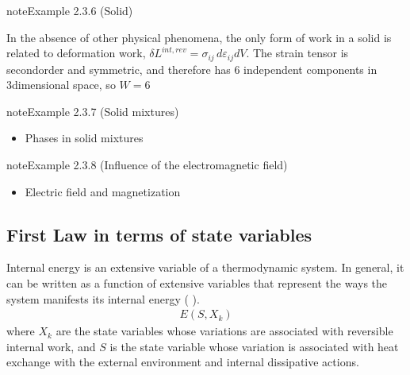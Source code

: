 \documentclass[letterpaper,10pt,english]{jupyterBook}
\begin{document}
\label{ch/principles-gibbs-phase-rule:example-9}
\begin{sphinxadmonition}{note}{Example 2.3.6 (Solid)}



\sphinxAtStartPar
In the absence of other physical phenomena, the only form of work in a solid is related to deformation work, \(\delta L^{int,rev} = \sigma_{ij} \, d \varepsilon_{ij} dV\). The strain tensor is second\sphinxhyphen{}order and symmetric, and therefore has 6 independent components in 3\sphinxhyphen{}dimensional space, so \(W=6\)
\end{sphinxadmonition}
\label{ch/principles-gibbs-phase-rule:example-10}
\begin{sphinxadmonition}{note}{Example 2.3.7 (Solid mixtures)}


\begin{itemize}
\item {} 
\sphinxAtStartPar
Phases in solid mixtures 

\end{itemize}
\end{sphinxadmonition}
\label{ch/principles-gibbs-phase-rule:example-11}
\begin{sphinxadmonition}{note}{Example 2.3.8 (Influence of the electromagnetic field)}


\begin{itemize}
\item {} 
\sphinxAtStartPar
Electric field and magnetization 

\end{itemize}
\end{sphinxadmonition}


\subsection{First Law in terms of state variables}
\label{\detokenize{ch/principles-gibbs-phase-rule:first-law-in-terms-of-state-variables}}\label{\detokenize{ch/principles-gibbs-phase-rule:physics-hs-thermodynamics-foundation-principles-gibbs-phase-rule-first}}
\sphinxAtStartPar
Internal energy is an extensive variable of a thermodynamic system. In general, it can be written as a function of extensive variables that represent the ways the system manifests its internal energy ( ).
\begin{equation*}
\begin{split}E(S, X_k)\end{split}
\end{equation*}
\sphinxAtStartPar
where \( X_k \) are the state variables whose variations are associated with reversible internal work, and \( S \) is the state variable whose variation is associated with heat exchange with the external environment and internal dissipative actions.  
\end{document}
